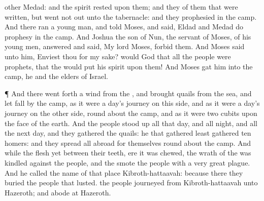 {other
Medad: and the
spirit
rested upon them; and they
{} of them that were
written, but went not
out unto the
tabernacle: and they
prophesied in the
camp.
And there
ran a young
man, and
told
Moses, and
said,
Eldad and
Medad do
prophesy in the
camp.
And
Joshua the
son of
Nun, the
servant of
Moses,
{} of his young
men,
answered and
said, My
lord
Moses,
forbid them.
And
Moses
said unto him,
Enviest thou for my sake? would God that all
the
{}
people were
prophets,
{} that the
{} would
put his
spirit upon them!
And
Moses
gat him into the
camp, he and the
elders of
Israel.
\par }{\PP {}¶ And there went
forth a
wind from the
{}, and
brought
quails from the
sea, and let
{}
fall by the
camp, as it were a
day’s
journey on this
side, and as it were a
day’s
journey on the other
side, round
about the
camp, and as it were two
cubits
{} upon the
face of the
earth.
And the
people stood
up all that
day, and all
{}
night, and all the
next
day, and they
gathered the
quails: he that gathered
least
gathered
ten
homers: and they
spread
{} all
abroad for themselves round
about the
camp.
And while the
flesh
{}
yet between their
teeth, ere it was
chewed, the
wrath of the
{} was
kindled against the
people, and the
{}
smote the
people with a
very
great
plague.
And he
called the
name of that
place
Kibroth-hattaavah: because there they
buried the
people that
lusted.
 the
people
journeyed from
Kibroth-hattaavah unto
Hazeroth; and abode at
Hazeroth.

}
